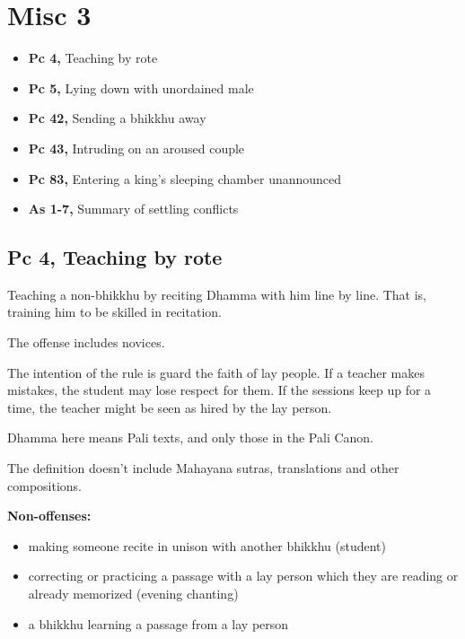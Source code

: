 \chapter{Misc 3}

\begin{itemize}
\tightlist
\item
  \textbf{Pc 4,} Teaching by rote
\item
  \textbf{Pc 5,} Lying down with unordained male
\item
  \textbf{Pc 42,} Sending a bhikkhu away
\item
  \textbf{Pc 43,} Intruding on an aroused couple
\item
  \textbf{Pc 83,} Entering a king's sleeping chamber unannounced
\item
  \textbf{As 1-7,} Summary of settling conflicts
\end{itemize}

\section{Pc 4, Teaching by rote}

\begin{multicols}{2}

Teaching a non-bhikkhu by reciting Dhamma with him line by line. That
is, training him to be skilled in recitation.

The offense includes novices.

The intention of the rule is guard the faith of lay people. If a teacher
makes mistakes, the student may lose respect for them. If the sessions
keep up for a time, the teacher might be seen as hired by the lay
person.

Dhamma here means Pali texts, and only those in the Pali Canon.

The definition doesn't include Mahayana sutras, translations and other
compositions.

\textbf{Non-offenses:}

\begin{itemize}
\tightlist
\item
  making someone recite in unison with another bhikkhu (student)
\item
  correcting or practicing a passage with a lay person which they are
  reading or already memorized (evening chanting)
\item
  a bhikkhu learning a passage from a lay person
\end{itemize}

\end{multicols}


